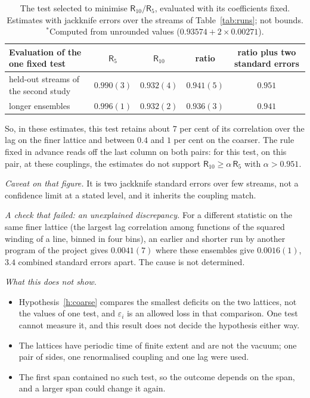 \begin{table}[htbp]
\caption{The test selected to minimise $\mathsf R_{10}/\mathsf R_5$, evaluated with its coefficients fixed.
Estimates with jackknife errors over the streams of Table~\ref{tab:runs}; not bounds. $^{*}$Computed from
unrounded values ($0.93574+2\times0.00271$).}\label{tab:cross}
\centering\small
\begin{tabular}{@{}lcccc@{}}
\toprule
Evaluation of the one fixed test & $\mathsf R_5$ & $\mathsf R_{10}$ & ratio & ratio plus two standard errors \\
\midrule
held-out streams of the second study & $0.990(3)$ & $0.932(4)$ & $0.941(5)$ & $0.951$ \\
longer ensembles & $0.996(1)$ & $0.932(2)$ & $0.936(3)$ & $0.941$\rlap{$^{*}$} \\
\bottomrule
\end{tabular}
\end{table}

So, in these estimates, this test retains about $7$ per cent of its correlation over the lag on the finer lattice and between
$0.4$ and $1$ per cent on the coarser. The rule fixed in advance reads off the last column on both pairs: for
this test, on this pair, at these couplings, the estimates do not support
$\mathsf R_{10}\ge\alpha\,\mathsf R_5$ with $\alpha>0.951$.

\emph{Caveat on that figure.} It is two jackknife standard errors over few streams, not a confidence limit at
a stated level, and it inherits the coupling match.

\emph{A check that failed: an unexplained discrepancy.} For a different statistic on the same finer lattice (the largest lag correlation among functions of the
squared winding of a line, binned in four bins),
an earlier and shorter run by another program of the project gives $0.0041(7)$ where these ensembles give
$0.0016(1)$, $3.4$ combined standard errors apart. The cause is not determined.

\emph{What this does not show.}
\begin{itemize}
\item Hypothesis~\ref{h:coarse} compares the smallest deficits on the two lattices, not the values of one
test, and $\varepsilon_i$ is an allowed loss in that comparison. One test cannot measure it, and this result
does not decide the hypothesis either way.
\item The lattices have periodic time of finite extent and are not the vacuum; one pair of sides, one
renormalised coupling and one lag were used.
\item The first span contained no such test, so the outcome depends on the span, and a larger span could
change it again.
\end{itemize}

